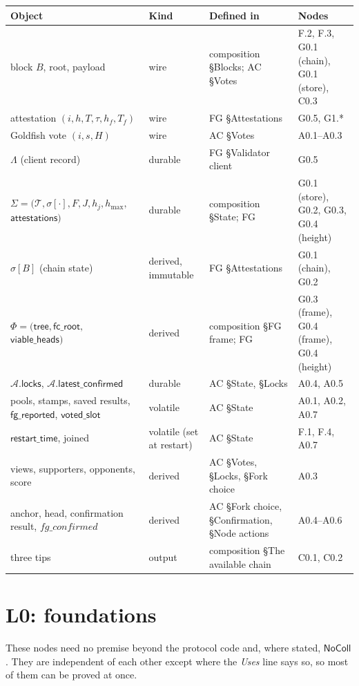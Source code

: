 \documentclass{article}
\newcommand{\T}{\mathcal T}
\newcommand{\hmax}{h_{\max}}
\newcommand{\AC}{\mathcal A}
\newcommand{\Fr}{\Phi}
\newcommand{\fcroot}{\mathsf{fc\_root}}
\newcommand{\allowed}{\mathsf{viable\_heads}}
\newcommand{\latestConfirmed}{\mathsf{latest\_confirmed}}
\begin{document}
\begin{longtable}{@{}>{\raggedright\arraybackslash}p{3.6cm}>{\raggedright\arraybackslash}p{2.0cm}>{\raggedright\arraybackslash}p{4.2cm}>{\raggedright\arraybackslash}p{3.2cm}@{}}
\hline
Object & Kind & Defined in & Nodes\\
\hline
block $B$, root, payload & wire & composition \S Blocks; AC \S Votes & F.2, F.3, G0.1 (chain), G0.1 (store), C0.3\\
attestation $(i,h,T,\tau,h_f,T_f)$ & wire & FG \S Attestations & G0.5, G1.*\\
Goldfish vote $(i,s,H)$ & wire & AC \S Votes & A0.1--A0.3\\
$\Lambda$ (client record) & durable & FG \S Validator client & G0.5\\
$\Sigma=(\T,\sigma[\cdot],F,J,h_j,\hmax,$ $\mathsf{attestations})$ & durable & composition \S State; FG & G0.1 (store), G0.2, G0.3, G0.4 (height)\\
$\sigma[B]$ (chain state) & derived, immutable & FG \S Attestations & G0.1 (chain), G0.2\\
$\Fr=(\mathsf{tree},\fcroot,$ $\allowed)$ & derived & composition \S FG frame; FG & G0.3 (frame), G0.4 (frame), G0.4 (height)\\
$\AC.\mathsf{locks}$, $\AC.\latestConfirmed$ & durable & AC \S State, \S Locks & A0.4, A0.5\\
pools, stamps, saved results, $\mathsf{fg\_reported}$, $\mathsf{voted\_slot}$ & volatile & AC \S State & A0.1, A0.2, A0.7\\
$\mathsf{restart\_time}$, joined & volatile (set at restart) & AC \S State & F.1, F.4, A0.7\\
views, supporters, opponents, score & derived & AC \S Votes, \S Locks, \S Fork choice & A0.3\\
anchor, head, confirmation result, $\mathit{fg\_confirmed}$ & derived & AC \S Fork choice, \S Confirmation, \S Node actions & A0.4--A0.6\\
three tips & output & composition \S The available chain & C0.1, C0.2\\
\hline
\end{longtable}

\section{L0: foundations}\label{sec:l0}

These nodes need no premise beyond the protocol code and, where stated,
$\mathsf{NoColl}$.  They are independent of each other except where the
\emph{Uses} line says so, so most of them can be proved at once.
\end{document}
